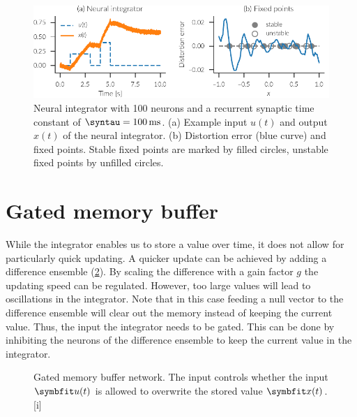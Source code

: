 \begin{figure}
    \centering
    \includegraphics{figures/integrator}
    \caption[Neural integrator]{Neural integrator with 100 neurons and a recurrent synaptic time constant of $\syntau = \SI{100}{\milli\second}$. (a) Example input $u(t)$ and output $x(t)$ of the neural integrator. (b) Distortion error (blue curve) and fixed points. Stable fixed points are marked by filled circles, unstable fixed points by unfilled circles.}\label{fig:integrator}
\end{figure}


\section{Gated memory buffer}
While the integrator enables us to store a value over time, it does not allow for particularly quick updating.
A quicker update can be achieved by adding a difference ensemble (\cref{fig:gated-mem}).
By scaling the difference with a gain factor $g$ the updating speed can be regulated.
However, too large values will lead to oscillations in the integrator.
Note that in this case feeding a null vector to the difference ensemble will clear out the memory instead of keeping the current value.
Thus, the input the integrator needs to be gated.
This can be done by inhibiting the neurons of the difference ensemble to keep the current value in the integrator.
\begin{figure}
    \begin{captionbeside}{Gated memory buffer network. The  input controls whether the input $\vc u(t)$ is allowed to overwrite the stored value $\vc x(t)$.}[i]
\end{captionbeside}\label{fig:gated-mem}
\end{figure}

